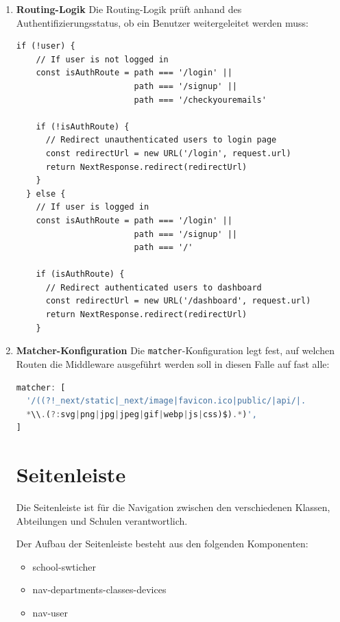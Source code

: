 \begin{inhalt}
\begin{enumerate}[label=\textbf{\arabic*.}]
\newpage

  \item \textbf{Routing-Logik}
  Die Routing-Logik prüft anhand des Authentifizierungsstatus, ob ein Benutzer weitergeleitet werden muss:


\begin{lstlisting}[style=mytsx]
  if (!user) {
    // If user is not logged in
    const isAuthRoute = path === '/login' || 
                        path === '/signup' || 
                        path === '/checkyouremails'
    
    if (!isAuthRoute) {
      // Redirect unauthenticated users to login page
      const redirectUrl = new URL('/login', request.url)
      return NextResponse.redirect(redirectUrl)
    }
  } else {
    // If user is logged in
    const isAuthRoute = path === '/login' || 
                        path === '/signup' || 
                        path === '/'
    
    if (isAuthRoute) {
      // Redirect authenticated users to dashboard
      const redirectUrl = new URL('/dashboard', request.url)
      return NextResponse.redirect(redirectUrl)
    }

  \end{lstlisting}

  \item \textbf{Matcher-Konfiguration}
  Die \texttt{matcher}-Konfiguration legt fest, auf welchen Routen die Middleware ausgeführt werden soll in diesen Falle auf fast alle:

\begin{lstlisting}[language=TypeScript]
matcher: [
  '/((?!_next/static|_next/image|favicon.ico|public/|api/|.
  *\\.(?:svg|png|jpg|jpeg|gif|webp|js|css)$).*)',
]


\end{lstlisting}



\clearpage

\newpage

\section{Seitenleiste}

Die Seitenleiste ist für die Navigation zwischen den verschiedenen Klassen, Abteilungen und Schulen verantwortlich.  

Der Aufbau der Seitenleiste besteht aus den folgenden Komponenten:

\begin{itemize}
    \item school-swticher
    \item nav-departments-classes-devices
    \item nav-user
\end{itemize}


\end{enumerate}
\end{inhalt}
